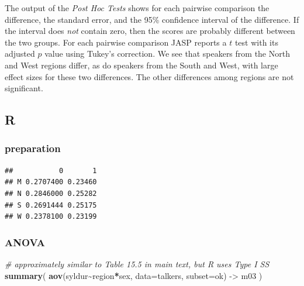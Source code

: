 \documentclass[
]{book}
\newenvironment{Shaded}{\begin{snugshade}}{\end{snugshade}}
\newcommand{\CommentTok}[1]{\textcolor[rgb]{0.56,0.35,0.01}{\textit{#1}}}
\newcommand{\DataTypeTok}[1]{\textcolor[rgb]{0.13,0.29,0.53}{#1}}
\newcommand{\FloatTok}[1]{\textcolor[rgb]{0.00,0.00,0.81}{#1}}
\newcommand{\KeywordTok}[1]{\textcolor[rgb]{0.13,0.29,0.53}{\textbf{#1}}}
\newcommand{\NormalTok}[1]{#1}
\newcommand{\OperatorTok}[1]{\textcolor[rgb]{0.81,0.36,0.00}{\textbf{#1}}}
\newcommand{\StringTok}[1]{\textcolor[rgb]{0.31,0.60,0.02}{#1}}
\begin{document}
The output of the \emph{Post Hoc Tests} shows for each pairwise comparison the difference, the standard error, and the 95\% confidence interval of the difference. If the interval does \emph{not} contain zero, then the scores are probably different between the two groups. For each pairwise comparison JASP reports a \(t\) test with its adjusted \(p\) value using Tukey's correction. We see that speakers from the North and West regions differ, as do speakers from the South and West, with large effect sizes for these two differences. The other differences among regions are not significant.

\hypertarget{r-15}{%
\subsection{R}\label{r-15}}

\hypertarget{preparation-6}{%
\subsubsection{preparation}\label{preparation-6}}

\begin{Shaded}
\end{Shaded}

\begin{verbatim}
##           0       1
## M 0.2707400 0.23460
## N 0.2846000 0.25282
## S 0.2691444 0.25175
## W 0.2378100 0.23199
\end{verbatim}

\hypertarget{anova-4}{%
\subsubsection{ANOVA}\label{anova-4}}

\begin{Shaded}
\begin{Highlighting}[]
\CommentTok{\# approximately similar to Table 15.5 in main text, but R uses Type I SS}
\KeywordTok{summary}\NormalTok{( }\KeywordTok{aov}\NormalTok{(syldur}\OperatorTok{\textasciitilde{}}\NormalTok{region}\OperatorTok{*}\NormalTok{sex, }\DataTypeTok{data=}\NormalTok{talkers, }\DataTypeTok{subset=}\NormalTok{ok) {-}\textgreater{}}\StringTok{ }\NormalTok{m03 )}
\end{Highlighting}
\end{Shaded}
\end{document}
